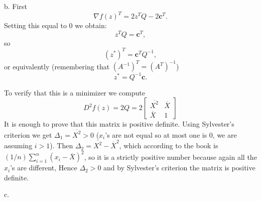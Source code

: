 \documentclass{article}
\newcommand{\bld}[1]{\boldsymbol{#1}}
\begin{document}
b. First
\[
	\nabla f(z)^T=2z^TQ-2\bld{c}^T.
\]
Setting this equal to 0 we obtain:
\[
	z^TQ=\bld{c}^T,
\]
so
\[
	(z^*)^T=\bld{c}^TQ^{-1},
\]
or equivalently (remembering that $(A^{-1})^T=(A^T)^{-1}$)
\[
	z^*=Q^{-1}\bld{c}.
\]

To verify that this is a minimizer we compute
\[
	D^2f(z)=2Q
	=
	2\begin{bmatrix}
		\overline{X^2} & \overline{X}\\
		\overline{X} & 1
	\end{bmatrix}
\]
It is enough to prove that this matrix is positive definite.
Using Sylvester's criterion we get $\Delta_1=\overline{X^2}>0$ ($x_i$'s are not
equal so at most one is 0, we are assuming $i>1$). Then
$\Delta_2=\overline{X^2}-\overline{X}^2$, which according to the book is
$(1/n)\sum_{i=1}^n(x_i-\overline{X})^2$, so it is a strictly positive number
because again all the $x_i$'s are different, Hence $\Delta_2>0$ and by
Sylvester's criterion the matrix is positive definite.

c.
\end{document}
